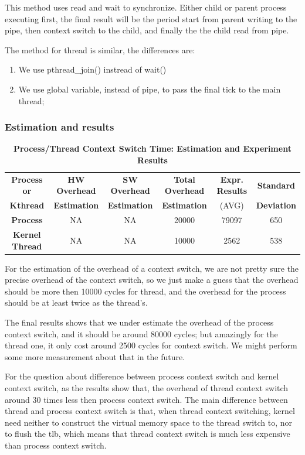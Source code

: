 This method uses read and wait to synchronize. Either child or parent process executing first, the final result will be the period start from parent writing to the pipe, then context switch to the child, and finally the the child read from pipe.

The method for thread is similar, the differences are:

\begin{enumerate}
    \item We use pthread\_join() instread of wait()
    \item We use global variable, instead of pipe, to pass the final tick to the main thread;
\end{enumerate}


\subsubsection{Estimation and results}
\begin{table}[ht]
    \centering
    \caption{\textbf{Process/Thread Context Switch Time: Estimation and Experiment Results}}
    \begin{threeparttable}
        \begin{tabular}{cccccc}
        \hline
        \textbf{Process or} & \textbf{HW Overhead} & \textbf{SW Overhead } & \textbf{Total Overhead} & \textbf{Expr.        Results} & \textbf{Standard} \\
        \textbf{Kthread} & \textbf{Estimation}       &  \textbf{Estimation}         & \textbf{Estimation}  & (AVG)   & \textbf{Deviation}\\
        \hline
        \textbf{Process} & NA & NA & 20000 & 79097  &  650\\
        \textbf{Kernel Thread} & NA & NA & 10000 & 2562 & 538\\
        \hline
        \end{tabular}
    \end{threeparttable}
    \label{context_switch_time}
\end{table}

For the estimation of the overhead of a context switch, we are not pretty sure the precise overhead of the context switch, so we just make a guess that the overhead should be more then 10000 cycles for thread, and the overhead for the process should be at least twice as the thread's.

The final results shows that we under estimate the overhead of the process context switch, and it should be around 80000 cycles; but amazingly for the thread one, it only cost around 2500 cycles for context switch. We might perform some more measurement about that in the future.

For the question about difference between process context switch and kernel context switch, as the results show that, the overhead of thread context switch around 30 times less then process context switch. The main difference between thread and process context switch
is that, when thread context switching, kernel need neither to construct the virtual memory space to the thread switch to, nor to flush the tlb, which means that thread context switch is much less expensive than process context switch.
